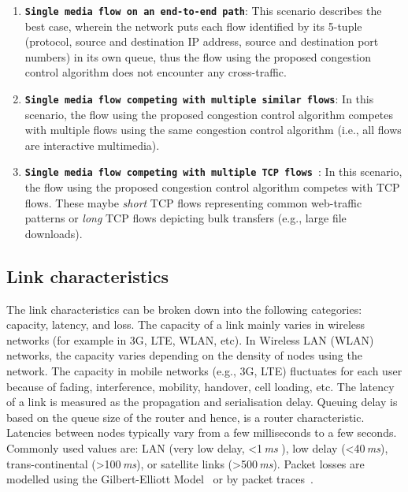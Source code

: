 \begin{enumerate}
\setlength{\itemsep}{0pt}

\item \textbf{\texttt{Single media flow on an end-to-end path}}: This scenario
describes the best case, wherein the network puts each flow identified by its
5-tuple (protocol, source and destination IP address, source and destination
port numbers) in its own queue, thus the flow using the proposed congestion
control algorithm does not encounter any cross-traffic.

\item \textbf{\texttt{Single media flow competing with multiple similar
flows}}: In this scenario, the flow using the proposed congestion control
algorithm competes with multiple flows using the same congestion control algorithm
(i.e., all flows are interactive multimedia).


\item \textbf{\texttt{Single media flow competing with multiple TCP flows }}:
In this scenario, the flow using the proposed congestion control algorithm
competes with TCP flows. These maybe \emph{short} TCP flows representing
common web-traffic patterns or \emph{long} TCP flows depicting bulk transfers
(e.g., large file downloads).

\end{enumerate}





\subsection{Link characteristics}

The link characteristics can be broken down into the following categories:
capacity, latency, and loss. The capacity of a link mainly varies in wireless
networks (for example in 3G, LTE, WLAN, etc). In Wireless LAN (WLAN) networks,
the capacity varies depending on the density of nodes using the network. The capacity in
mobile networks (e.g., 3G, LTE) fluctuates for each user because of fading,
interference, mobility, handover, cell loading, etc. The latency of a link
is measured as the propagation and serialisation delay. Queuing delay is based on the
queue size of the router and hence, is a router characteristic. Latencies between
nodes typically vary from a few milliseconds to a few seconds. Commonly used
values are: LAN (very low delay, <1\,\emph{ms} ), low delay (<40\,\emph{ms}),
trans-continental (>100\,\emph{ms}), or satellite links (>500\,\emph{ms}).
Packet losses are modelled using the Gilbert-Elliott
Model~\cite{gilbert1960capacity, elliott1963estimates} or by packet
traces~\cite{ellis:2011:dataset, 3gppSim}.


